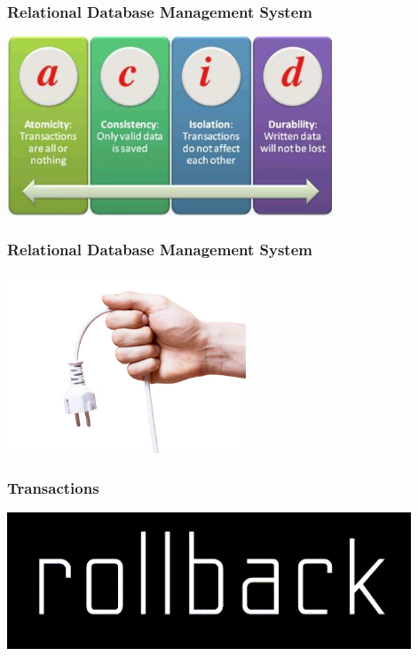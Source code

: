 \documentclass{beamer}
\begin{document}
\begin{frame}
  \frametitle{Relational Database Management System}

  \begin{center}
    \includegraphics[height=2.1in]{acid-details.jpg}
  \end{center}
\end{frame}

\begin{frame}
  \frametitle{Relational Database Management System}

  
  \begin{center}
    \includegraphics[height=2.1in]{cord-unplugged.jpg}
  \end{center}
\end{frame}

\begin{frame}
  \frametitle{Transactions}


  \begin{center}
    \includegraphics[height=1.6in]{rollback-wordmark.png}
  \end{center}
\end{frame}
\end{document}
